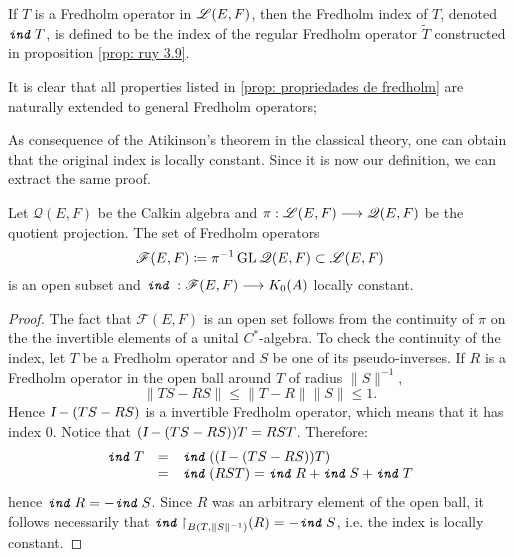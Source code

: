 \begin{definicao}
If $T$ is a Fredholm operator in $\mathscr L(E, F)$, then the Fredholm index of $T$, denoted $\texttt{\textit{ind}}\, T$, is defined to be the index of the regular Fredholm operator $\widetilde{T}$ constructed in proposition \ref{prop: ruy 3.9}.
\end{definicao}

It is clear that all properties listed in \ref{prop: propriedades de fredholm} are naturally extended to general Fredholm operators;

As consequence of the Atikinson's theorem in the classical theory, one can obtain that the original index is locally constant. Since it is now our definition, we can extract the same proof.

\begin{proposicao}
    Let $\mathscr Q(E,F)$ be the Calkin algebra and $\pi: \mathscr L(E,F) \longrightarrow \mathscr Q(E,F)$ be the quotient projection. The set of Fredholm operators 
    \begin{equation*}
        \mathscr F(E,F) \coloneqq \pi^{-1}\operatorname{GL}\mathscr Q(E,F) \subset \mathscr L(E,F)
    \end{equation*}
    is an open subset and $\texttt{\textit{ind}}\, : \mathscr F(E,F)\longrightarrow K_0(A)$ locally constant.
    \begin{proof}
    The fact that $\mathscr F(E,F)$ is an open set follows from the continuity of $\pi$ on the the invertible elements of a unital $C^*$-algebra. To check the continuity of the index, let $T$ be a Fredholm operator and $S$ be one of its pseudo-inverses. If $R$ is a Fredholm operator in the open ball around $T$ of radius $\|S\|^{-1}$,
    \[
    \|TS - RS\| \leqslant \|T-R\|\|S\| \leqslant 1.
    \]
    Hence $\textsl{I} - (TS - RS)$ is a invertible Fredholm operator, which means that it has index 0. Notice that $(\textsl{I} - (TS - RS))T = RST$. Therefore:
    \begin{equation*}
        \begin{array}{rcl}
            \texttt{\textit{ind}}\, T &=& \texttt{\textit{ind}}\,((\textsl{I} - (TS - RS))T) \\
            &=&\texttt{\textit{ind}}\,(RST) = \texttt{\textit{ind}}\, R+\texttt{\textit{ind}}\, S + \texttt{\textit{ind}}\, T
        \end{array}
    \end{equation*}
    hence $\texttt{\textit{ind}}\, R = - \texttt{\textit{ind}}\, S$. Since $R$ was an arbitrary element of the open ball, it follows necessarily that $\texttt{\textit{ind}}\, {\upharpoonright}_{{B}(T, {\|S\|^{-1}})}(R) = -\texttt{\textit{ind}}\, S$, i.e. the index is locally constant.
    \end{proof}
\end{proposicao}

